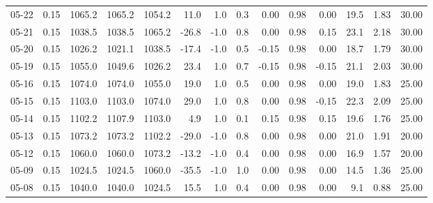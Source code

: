\begin{threeparttable}
{\begin{tabular}{lrrrrrrrrrrrrr}
  05-22 &     0.15 & 1065.2 & 1065.2 & 1054.2 &       11.0 &                      1.0 &                 0.3 &       0.00 &      0.98 &           0.00 &             19.5 &            1.83 &                  30.00 \\
  05-21 &     0.15 & 1038.5 & 1038.5 & 1065.2 &      -26.8 &                     -1.0 &                 0.8 &       0.00 &      0.98 &           0.15 &             23.1 &            2.18 &                  30.00 \\
  05-20 &     0.15 & 1026.2 & 1021.1 & 1038.5 &      -17.4 &                     -1.0 &                 0.5 &      -0.15 &      0.98 &           0.00 &             18.7 &            1.79 &                  30.00 \\
  05-19 &     0.15 & 1055.0 & 1049.6 & 1026.2 &       23.4 &                      1.0 &                 0.7 &      -0.15 &      0.98 &          -0.15 &             21.1 &            2.03 &                  30.00 \\
  05-16 &     0.15 & 1074.0 & 1074.0 & 1055.0 &       19.0 &                      1.0 &                 0.5 &       0.00 &      0.98 &           0.00 &             19.0 &            1.83 &                  25.00 \\
  05-15 &     0.15 & 1103.0 & 1103.0 & 1074.0 &       29.0 &                      1.0 &                 0.8 &       0.00 &      0.98 &          -0.15 &             22.3 &            2.09 &                  25.00 \\
  05-14 &     0.15 & 1102.2 & 1107.9 & 1103.0 &        4.9 &                      1.0 &                 0.1 &       0.15 &      0.98 &           0.15 &             19.6 &            1.76 &                  25.00 \\
  05-13 &     0.15 & 1073.2 & 1073.2 & 1102.2 &      -29.0 &                     -1.0 &                 0.8 &       0.00 &      0.98 &           0.00 &             21.0 &            1.91 &                  20.00 \\
  05-12 &     0.15 & 1060.0 & 1060.0 & 1073.2 &      -13.2 &                     -1.0 &                 0.4 &       0.00 &      0.98 &           0.00 &             16.9 &            1.57 &                  20.00 \\
  05-09 &     0.15 & 1024.5 & 1024.5 & 1060.0 &      -35.5 &                     -1.0 &                 1.0 &       0.00 &      0.98 &           0.00 &             14.5 &            1.36 &                  25.00 \\
  05-08 &     0.15 & 1040.0 & 1040.0 & 1024.5 &       15.5 &                      1.0 &                 0.4 &       0.00 &      0.98 &           0.00 &              9.1 &            0.88 &                  25.00 \\

\end{tabular}}
\end{threeparttable}
